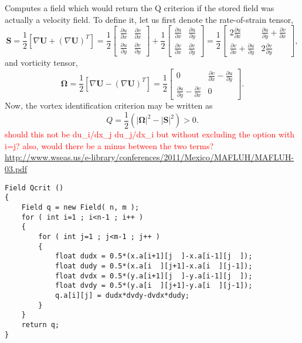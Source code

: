 \documentclass[notitlepage]{article}
\begin{document}
Computes a field which would return the Q criterion if the stored
field was actually a velocity field.
To define it, let us first denote the rate-of-strain tensor,
%
\begin{equation}
\mathbf{S} = \frac{1}{2}\left[\nabla\mathbf{U}+\left(\nabla\mathbf{U}\right)^T\right]
	= \frac{1}{2} \begin{bmatrix}
		\frac{\partial u}{\partial x} & \frac{\partial v}{\partial x} \\
		\frac{\partial u}{\partial y} & \frac{\partial v}{\partial y}
		\end{bmatrix}
	+ \frac{1}{2} \begin{bmatrix}
		\frac{\partial u}{\partial x} & \frac{\partial u}{\partial y} \\
		\frac{\partial v}{\partial x} & \frac{\partial v}{\partial y}
		\end{bmatrix}
	= \frac{1}{2} \begin{bmatrix}
		2\frac{\partial u}{\partial x} & \frac{\partial u}{\partial y} + \frac{\partial v}{\partial x} \\
		\frac{\partial v}{\partial x} + \frac{\partial u}{\partial y} & 2\frac{\partial v}{\partial y}
		\end{bmatrix} ,
\end{equation}
%
and vorticity tensor,
%
\begin{equation}
\mathbf{\Omega} = \frac{1}{2}\left[\nabla\mathbf{U}-\left(\nabla\mathbf{U}\right)^T\right]
	= \frac{1}{2} \begin{bmatrix}
		0 & \frac{\partial v}{\partial x} - \frac{\partial u}{\partial y} \\
		\frac{\partial u}{\partial y} - \frac{\partial v}{\partial x} & 0
		\end{bmatrix} .
\end{equation}
%
Now, the vortex identification criterion may be written as
%
\begin{equation}
Q = \frac{1}{2} \left(\left|\mathbf{\Omega}\right|^2
	- \left|\mathbf{S}\right|^2 \right) > 0.
\end{equation}
\textcolor{red}{should this not be du\_i/dx\_j du\_j/dx\_i but without
excluding the option with i=j? also, would there be a minus between the
two terms?}
\url{http://www.wseas.us/e-library/conferences/2011/Mexico/MAFLUH/MAFLUH-03.pdf}

\begin{lstlisting}[style=myCpp]
Field Qcrit ()
{
	Field q = new Field( n, m );
	for ( int i=1 ; i<n-1 ; i++ )
	{
		for ( int j=1 ; j<m-1 ; j++ )
		{
			float dudx = 0.5*(x.a[i+1][j  ]-x.a[i-1][j  ]);
			float dudy = 0.5*(x.a[i  ][j+1]-x.a[i  ][j-1]);
			float dvdx = 0.5*(y.a[i+1][j  ]-y.a[i-1][j  ]);
			float dvdy = 0.5*(y.a[i  ][j+1]-y.a[i  ][j-1]);
			q.a[i][j] = dudx*dvdy-dvdx*dudy;
		}
	}
	return q;
}
\end{lstlisting}
\end{document}
